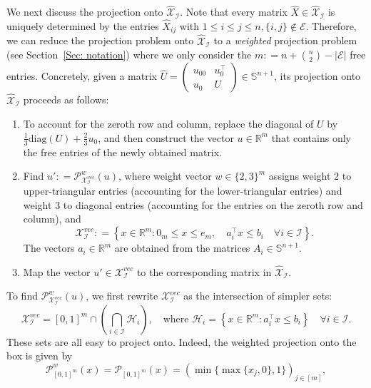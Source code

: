 \documentclass[11pt, a4paper]{article}
\newcommand{\diag}[1]{{\text{diag}\left(#1\right)}}
\newcommand{\eqdef}{\mathrel{\mathop:}=}
\newcommand{\mc}{\mathcal}
\newcommand{\aug}[1]{\hat{#1}}
\begin{document}
We next discuss the projection onto $\aug{\mc{X}}_\mc{I}$.
Note that every matrix $\aug{X} \in \aug{\mc{X}}_\mc{I}$ is uniquely determined by the entries $\aug{X}_{ij}$ with $1 \leq i \leq j\leq n, \{i,j\} \not \in \mc{E}$. 
Therefore, we can reduce the projection problem onto $\aug{\mc{X}}_\mc{I}$ to a \textit{weighted} projection problem (see Section~\ref{Sec: notation}) where we only consider the $m \eqdef n + \binom{n}{2}-|\mc{E}|$ free entries. 
Concretely, given a matrix $\aug{U} = \begin{pmatrix} u_{00} & u_0^\top \\ u_0 & U \end{pmatrix} \in \mathbb{S}^{n+1}$, its projection onto $\aug{\mc{X}}_\mc{I}$ proceeds as follows:
\begin{enumerate}
    \item To account for the zeroth row and column, replace the diagonal of $U$ by $\frac{1}{3}\diag{U} + \frac{2}{3}u_0$, and then construct the vector $u \in \mathbb{R}^m$ that contains only the free entries of the newly obtained matrix.
    \item Find $u' \eqdef \mc{P}^w_{\mc{X}^{vec}_\mc{I}}(u)$, where weight vector $w \in \{2,3\}^m$ assigns weight $2$ to upper-triangular entries (accounting for the lower-triangular entries) and weight $3$ to diagonal entries (accounting for the entries on the zeroth row and column), and
    \begin{equation}
        \mc{X}^{vec}_\mc{I} \eqdef \left \{x \in \mathbb{R}^m: 0_m \leq x \leq e_m,\quad a_i^\top x \leq b_i \quad \forall i \in \mc{I} \right \}.
    \end{equation}
    The vectors $a_i \in \mathbb{R}^m$ are obtained from the matrices $A_i \in\mathbb{S}^{n+1}$.
    \item Map the vector $u' \in \mc{X}^{vec}_\mc{I}$ to the corresponding matrix in $\aug{\mc{X}}_\mc{I}$.
\end{enumerate}
To find $\mc{P}^w_{\mc{X}^{vec}_\mc{I}}(u)$, we first rewrite $\mc{X}^{vec}_\mc{I}$ as the intersection of simpler sets:
\begin{equation}
    \mc{X}^{vec}_\mc{I} = [0,1]^m \cap \left(\bigcap_{i \in \mc{I}}\mc{H}_i \right), \quad \text{where } \mc{H}_i = \left\{x \in \mathbb{R}^m: a_i^\top x \leq b_i\right\} \quad \forall i \in \mc{I}.
\end{equation}
These sets are all easy to project onto. Indeed, the weighted projection onto the box is given by
\begin{equation}
    \mc{P}^w_{[0,1]^m}(x) = \mc{P}_{[0,1]^m}(x) = \left(\min\{\max\{x_j, 0\}, 1\}\right)_{j \in [m]}, \label{eq: box projection}
\end{equation}
\end{document}
